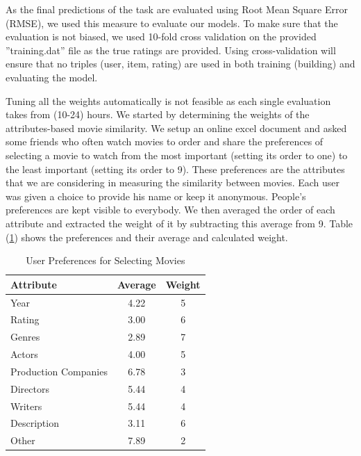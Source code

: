 \documentclass{sigish}
\begin{document}
As the final predictions of the task are evaluated using Root Mean Square Error (RMSE), we used this measure to evaluate our models. To make sure that the evaluation is not biased, we used 10-fold cross validation on the provided ''training.dat'' file as the true ratings are provided. Using cross-validation will ensure that no triples (user, item, rating) are used in both training (building) and evaluating the model.

Tuning all the weights automatically is not feasible as each single evaluation takes from (10-24) hours. We started by determining the weights of the attributes-based movie similarity. We setup an online excel document and asked some friends who often watch movies to order and share the preferences of selecting a movie to watch from the most important (setting its order to one) to the least important (setting its order to 9). These preferences are the attributes that we are considering in measuring the similarity between movies. Each user was given a choice to provide his name or keep it anonymous. People's preferences are kept visible to everybody. We then averaged the order of each attribute and extracted the weight of it by subtracting this average from 9. Table (\ref{tab:preferences}) shows the preferences and their average and calculated weight.

\begin{table}[]
\centering
\begin{tabular}{|l|c|c|}
\hline
\textbf{Attribute}   & \textbf{Average} & \textbf{Weight} \\ \hline
Year                 & 4.22             & 5               \\ \hline
Rating               & 3.00             & 6               \\ \hline
Genres               & 2.89             & 7               \\ \hline
Actors               & 4.00             & 5               \\ \hline
Production Companies & 6.78             & 3               \\ \hline
Directors            & 5.44             & 4               \\ \hline
Writers              & 5.44             & 4               \\ \hline
Description          & 3.11             & 6               \\ \hline
Other                & 7.89             & 2               \\ \hline  
\end{tabular}
\caption{User Preferences for Selecting Movies}
\label{tab:preferences}
\end{table}
\end{document}
